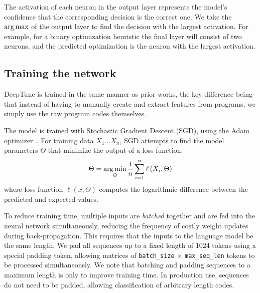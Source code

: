 The activation of each neuron in the output layer represents the model's confidence that the corresponding decision is the correct one. We take the $\operatorname*{arg\,max}$ of the output layer to find the decision with the largest activation. For example, for a binary optimization heuristic the final layer will consist of two neurons, and the predicted optimization is the neuron with the largest activation.


\subsection{Training the network}

DeepTune is trained in the same manner as prior works, the key difference being that instead of having to manually create and extract features from programs, we simply use the raw program codes themselves.

The model is trained with Stochastic Gradient Descent (SGD), using the Adam optimizer~\cite{Kingma2015}. For training data $X_1 \ldots X_n$, SGD attempts to find the model parameters $\Theta$ that minimize the output of a loss function:
%
\begin{equation}
  \Theta = \operatorname*{arg\,min}_{\Theta} \frac{1}{n} \sum_{i=1}^{n} \ell \left(X_i, \Theta \right)
\end{equation}
%
where loss function $\ell \left(x, \Theta \right)$ computes the logarithmic difference between the predicted and expected values.

To reduce training time, multiple inputs are \emph{batched} together and are fed into the neural network simultaneously, reducing the frequency of costly weight updates during back-propagation. This requires that the inputs to the language model be the same length. We pad all sequences up to a fixed length of 1024 tokens using a special padding token, allowing matrices of \texttt{batch\_size} $\times$ \texttt{max\_seq\_len} tokens to be processed simultaneously. We note that batching and padding sequences to a maximum length is only to improve training time. In production use, sequences do not need to be padded, allowing classification of arbitrary length codes.
